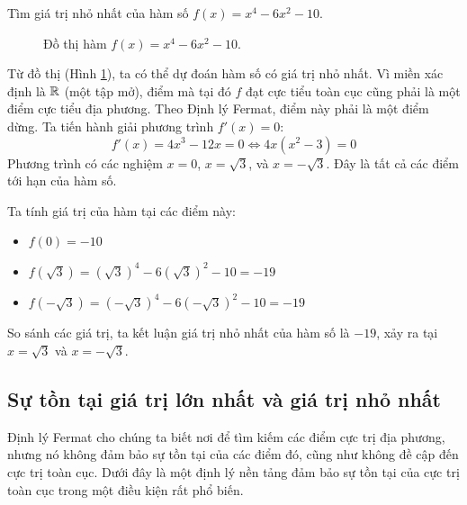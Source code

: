 \begin{example}\label{ex:quartic-extrema}
Tìm giá trị nhỏ nhất của hàm số $f(x) = x^4 - 6x^2 - 10$.
\begin{figure}[H]
    \centering
    \caption{Đồ thị hàm $f(x) = x^4 - 6x^2 - 10$.}
    \label{fig:quartic-extrema}
\end{figure}

Từ đồ thị (Hình \ref{fig:quartic-extrema}), ta có thể dự đoán hàm số có giá trị nhỏ nhất. Vì miền xác định là $\mathbb{R}$ (một tập mở), điểm mà tại đó $f$ đạt cực tiểu toàn cục cũng phải là một điểm cực tiểu địa phương. Theo Định lý Fermat, điểm này phải là một điểm dừng. Ta tiến hành giải phương trình $f'(x) = 0$:
$$ f'(x) = 4x^3 - 12x = 0 \iff 4x(x^2 - 3) = 0 $$
Phương trình có các nghiệm $x=0$, $x=\sqrt{3}$, và $x=-\sqrt{3}$. Đây là tất cả các điểm tới hạn của hàm số.

Ta tính giá trị của hàm tại các điểm này:
\begin{itemize}
    \item $f(0) = -10$
    \item $f(\sqrt{3}) = (\sqrt{3})^4 - 6(\sqrt{3})^2 - 10 = -19$
    \item $f(-\sqrt{3}) = (-\sqrt{3})^4 - 6(-\sqrt{3})^2 - 10 = -19$
\end{itemize}
So sánh các giá trị, ta kết luận giá trị nhỏ nhất của hàm số là $-19$, xảy ra tại $x=\sqrt{3}$ và $x=-\sqrt{3}$.
\end{example}

\subsection{Sự tồn tại giá trị lớn nhất và giá trị nhỏ nhất}
\label{sec:existence-global-extrema}

Định lý Fermat cho chúng ta biết nơi để tìm kiếm các điểm cực trị địa phương, nhưng nó không đảm bảo sự tồn tại của các điểm đó, cũng như không đề cập đến cực trị toàn cục. Dưới đây là một định lý nền tảng đảm bảo sự tồn tại của cực trị toàn cục trong một điều kiện rất phổ biến.

